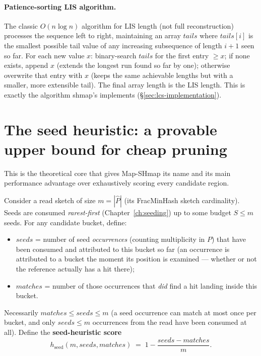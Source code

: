 \paragraph{Patience-sorting LIS algorithm.} The classic $O(n\log n)$ algorithm for LIS length
(not full reconstruction) processes the sequence left to right, maintaining an array
$\mathit{tails}$ where $\mathit{tails}[i]$ is the smallest possible tail value of any increasing
subsequence of length $i{+}1$ seen so far. For each new value $x$: binary-search $\mathit{tails}$
for the first entry $\ge x$; if none exists, append $x$ (extends the longest run found so far by
one); otherwise overwrite that entry with $x$ (keeps the same achievable lengths but with a
smaller, more extensible tail). The final array length is the LIS length. This is exactly the
algorithm shmap's  implements (\S\ref{sec:lcs-implementation}).

\section{The seed heuristic: a provable upper bound for cheap pruning}
\label{sec:seed-heuristic-theory}

This is the theoretical core that gives Map-SHmap its name and its main performance advantage
over exhaustively scoring every candidate region.

Consider a read sketch of size $m = |\hat P|$ (its FracMinHash sketch cardinality). Seeds are
consumed \emph{rarest-first} (Chapter~\ref{ch:seeding}) up to some budget $S \le m$ seeds. For any
candidate bucket, define:
\begin{itemize}[nosep]
  \item $\mathit{seeds}$ = number of seed \emph{occurrences} (counting multiplicity in $P$) that
    have been consumed and attributed to this bucket so far (an occurrence is attributed to a
    bucket the moment its position is examined --- whether or not the reference actually has a
    hit there);
  \item $\mathit{matches}$ = number of those occurrences that \emph{did} find a hit landing inside
    this bucket.
\end{itemize}
Necessarily $\mathit{matches} \le \mathit{seeds} \le m$ (a seed occurrence can match at most once
per bucket, and only $\mathit{seeds}\le m$ occurrences from the read have been consumed at all).
Define the \textbf{seed-heuristic score}
\[
  h_{\mathrm{seed}}(m, \mathit{seeds}, \mathit{matches}) \;=\; 1 - \frac{\mathit{seeds} -
  \mathit{matches}}{m}.
\]

